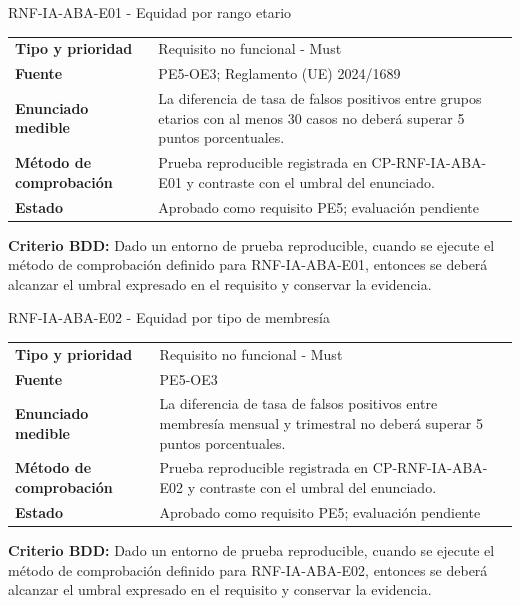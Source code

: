 \begin{reqbox}[colframe=Teal]{RNF-IA-ABA-E01 - Equidad por rango etario}
\begin{tabularx}{\textwidth}{>{\bfseries}p{3.2cm}Y}
Tipo y prioridad & Requisito no funcional - Must \\
Fuente & PE5-OE3; Reglamento (UE) 2024/1689 \\
Enunciado medible & La diferencia de tasa de falsos positivos entre grupos etarios con al menos 30 casos no deberá superar 5 puntos porcentuales. \\
Método de comprobación & Prueba reproducible registrada en CP-RNF-IA-ABA-E01 y contraste con el umbral del enunciado. \\
Estado & Aprobado como requisito PE5; evaluación pendiente \\
\end{tabularx}
\textbf{Criterio BDD:} Dado un entorno de prueba reproducible, cuando se ejecute el método de comprobación definido para RNF-IA-ABA-E01, entonces se deberá alcanzar el umbral expresado en el requisito y conservar la evidencia.
\end{reqbox}


\begin{reqbox}[colframe=Teal]{RNF-IA-ABA-E02 - Equidad por tipo de membresía}
\begin{tabularx}{\textwidth}{>{\bfseries}p{3.2cm}Y}
Tipo y prioridad & Requisito no funcional - Must \\
Fuente & PE5-OE3 \\
Enunciado medible & La diferencia de tasa de falsos positivos entre membresía mensual y trimestral no deberá superar 5 puntos porcentuales. \\
Método de comprobación & Prueba reproducible registrada en CP-RNF-IA-ABA-E02 y contraste con el umbral del enunciado. \\
Estado & Aprobado como requisito PE5; evaluación pendiente \\
\end{tabularx}
\textbf{Criterio BDD:} Dado un entorno de prueba reproducible, cuando se ejecute el método de comprobación definido para RNF-IA-ABA-E02, entonces se deberá alcanzar el umbral expresado en el requisito y conservar la evidencia.
\end{reqbox}



